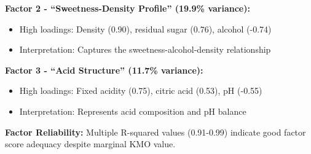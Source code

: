 \textbf{Factor 2 - ``Sweetness-Density Profile'' (19.9\% variance):}
\begin{itemize}
\item High loadings: Density (0.90), residual sugar (0.76), alcohol (-0.74)
\item Interpretation: Captures the sweetness-alcohol-density relationship
\end{itemize}

\textbf{Factor 3 - ``Acid Structure'' (11.7\% variance):}
\begin{itemize}
\item High loadings: Fixed acidity (0.75), citric acid (0.53), pH (-0.55)
\item Interpretation: Represents acid composition and pH balance
\end{itemize}

\textbf{Factor Reliability:} Multiple R-squared values (0.91-0.99) indicate good factor score adequacy despite marginal KMO value.